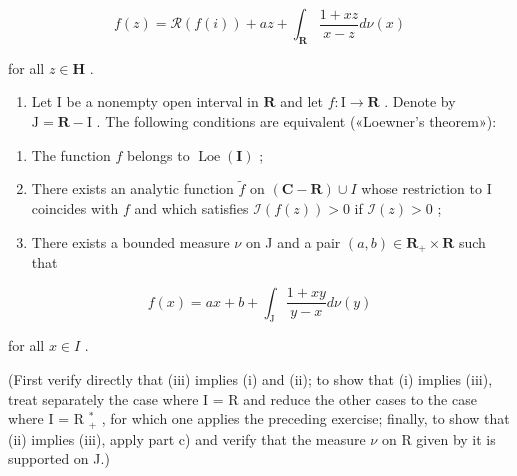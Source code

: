 \[
f (z) = \mathcal {R} (f (i)) + a z + \int_ {\mathbf {R}} \frac {1 + x z}{x - z} d \nu (x)
\]

for all \(z \in \mathbf{H}\) .

\begin{enumerate}
\def\labelenumi{\alph{enumi})}
\setcounter{enumi}{3}
\tightlist
\item
  Let I be a nonempty open interval in \(\mathbf{R}\) and let \(f\colon \mathrm{I}\to \mathbf{R}\) . Denote by \(\mathrm{J} = \mathbf{R} - \mathrm{I}\) . The following conditions are equivalent («Loewner's theorem»):
\end{enumerate}

\begin{enumerate}
\def\labelenumi{(\roman{enumi})}
\item
  The function \(f\) belongs to \(\operatorname{Loe}(\mathbf{I})\) ;
\item
  There exists an analytic function \(\widetilde{f}\) on \((\mathbf{C} - \mathbf{R}) \cup I\) whose restriction to I coincides with \(f\) and which satisfies \(\mathcal{I}(f(z)) > 0\) if \(\mathcal{I}(z) > 0\) ;
\item
  There exists a bounded measure \(\nu\) on J and a pair \((a,b)\in\mathbf{R}_{+}\times\mathbf{R}\) such that
\end{enumerate}

\[
f (x) = a x + b + \int_ {\mathrm{J}} \frac {1 + x y}{y - x} d \nu (y)
\]

for all \(x \in I\) .

(First verify directly that (iii) implies (i) and (ii); to show that (i) implies (iii), treat separately the case where I = R and reduce the other cases to the case where I = R \(_{+}^{*}\) , for which one applies the preceding exercise; finally, to show that (ii) implies (iii), apply part c) and verify that the measure \(\nu\) on R given by it is supported on J.)

